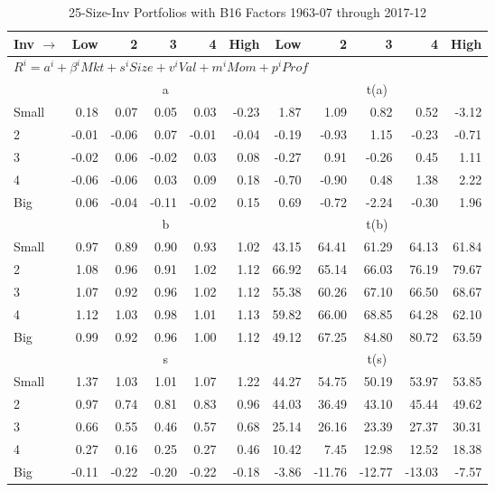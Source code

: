 
\begin{table}[!ht]
\footnotesize
\centering
\caption{25-Size-Inv Portfolios with B16 Factors 1963-07 through 2017-12}
\begin{tabular}{lrrrrrrrrrr}
  \toprule
    
    Inv $\rightarrow$ & Low & 2 & 3 & 4 & High & Low & 2 & 3 & 4 & High  \\ 
  \midrule
  \multicolumn{11}{l}{$R^i=a^i+\beta^iMkt+s^iSize+v^iVal+m^iMom+p^iProf$}  \\
  
     & \multicolumn{5}{c}{a} & \multicolumn{5}{c}{t(a)}   \\
     \cmidrule(r){2-6} \cmidrule(r){7-11} 
    Small  & 0.18  & 0.07  & 0.05  & 0.03  & -0.23  & 1.87  & 1.09  & 0.82  & 0.52  & -3.12   \\
    2  & -0.01  & -0.06  & 0.07  & -0.01  & -0.04  & -0.19  & -0.93  & 1.15  & -0.23  & -0.71   \\
    3  & -0.02  & 0.06  & -0.02  & 0.03  & 0.08  & -0.27  & 0.91  & -0.26  & 0.45  & 1.11   \\
    4  & -0.06  & -0.06  & 0.03  & 0.09  & 0.18  & -0.70  & -0.90  & 0.48  & 1.38  & 2.22   \\
    Big  & 0.06  & -0.04  & -0.11  & -0.02  & 0.15  & 0.69  & -0.72  & -2.24  & -0.30  & 1.96   \\
    
  
     & \multicolumn{5}{c}{b} & \multicolumn{5}{c}{t(b)}   \\
     \cmidrule(r){2-6} \cmidrule(r){7-11} 
    Small  & 0.97  & 0.89  & 0.90  & 0.93  & 1.02  & 43.15  & 64.41  & 61.29  & 64.13  & 61.84   \\
    2  & 1.08  & 0.96  & 0.91  & 1.02  & 1.12  & 66.92  & 65.14  & 66.03  & 76.19  & 79.67   \\
    3  & 1.07  & 0.92  & 0.96  & 1.02  & 1.12  & 55.38  & 60.26  & 67.10  & 66.50  & 68.67   \\
    4  & 1.12  & 1.03  & 0.98  & 1.01  & 1.13  & 59.82  & 66.00  & 68.85  & 64.28  & 62.10   \\
    Big  & 0.99  & 0.92  & 0.96  & 1.00  & 1.12  & 49.12  & 67.25  & 84.80  & 80.72  & 63.59   \\
    
  
     & \multicolumn{5}{c}{s} & \multicolumn{5}{c}{t(s)}   \\
     \cmidrule(r){2-6} \cmidrule(r){7-11} 
    Small  & 1.37  & 1.03  & 1.01  & 1.07  & 1.22  & 44.27  & 54.75  & 50.19  & 53.97  & 53.85   \\
    2  & 0.97  & 0.74  & 0.81  & 0.83  & 0.96  & 44.03  & 36.49  & 43.10  & 45.44  & 49.62   \\
    3  & 0.66  & 0.55  & 0.46  & 0.57  & 0.68  & 25.14  & 26.16  & 23.39  & 27.37  & 30.31   \\
    4  & 0.27  & 0.16  & 0.25  & 0.27  & 0.46  & 10.42  & 7.45  & 12.98  & 12.52  & 18.38   \\
    Big  & -0.11  & -0.22  & -0.20  & -0.22  & -0.18  & -3.86  & -11.76  & -12.77  & -13.03  & -7.57   \\
    

\end{tabular}
\end{table}
